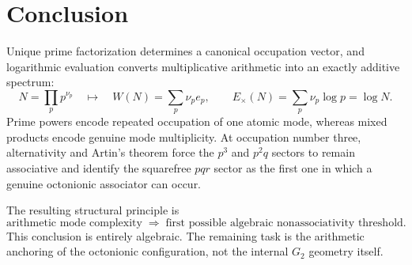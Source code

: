 \documentclass[11pt,a4paper]{article}
\theoremstyle{definition}
\theoremstyle{remark}
\begin{document}
\section{Conclusion}
Unique prime factorization determines a canonical occupation vector, and logarithmic evaluation converts multiplicative arithmetic into an exactly additive spectrum:
\[
\boxed{
N=\prod_pp^{\nu_p}
\quad\longmapsto\quad
W(N)=\sum_p\nu_pe_p,
\qquad
E_\times(N)=\sum_p\nu_p\log p=\log N.
}
\]
Prime powers encode repeated occupation of one atomic mode, whereas mixed products encode genuine mode multiplicity. At occupation number three, alternativity and Artin's theorem force the $p^3$ and $p^2q$ sectors to remain associative and identify the squarefree $pqr$ sector as the first one in which a genuine octonionic associator can occur.

The resulting structural principle is
\[
\boxed{
\text{arithmetic mode complexity}
\;\Longrightarrow\;
\text{first possible algebraic nonassociativity threshold}.
}
\]
This conclusion is entirely algebraic. The remaining task is the arithmetic anchoring of the octonionic configuration, not the internal $G_2$ geometry itself.
\end{document}
